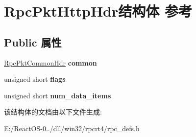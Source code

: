 \hypertarget{struct_rpc_pkt_http_hdr}{}\section{Rpc\+Pkt\+Http\+Hdr结构体 参考}
\label{struct_rpc_pkt_http_hdr}
\subsection*{Public 属性}
\begin{DoxyCompactItemize}
\item 
\mbox{\label{struct_rpc_pkt_http_hdr_acc02497468437b825fa3b664916b30fb}} 
\hyperlink{struct_rpc_pkt_common_hdr}{Rpc\+Pkt\+Common\+Hdr} {\bfseries common}
\item 
\mbox{\label{struct_rpc_pkt_http_hdr_adf2f73e5efa2e0e5c2063bb1c9366606}} 
unsigned short {\bfseries flags}
\item 
\mbox{\label{struct_rpc_pkt_http_hdr_a43756be3dbf115655798784a4467571a}} 
unsigned short {\bfseries num\+\_\+data\+\_\+items}
\end{DoxyCompactItemize}


该结构体的文档由以下文件生成\+:\begin{DoxyCompactItemize}
\item 
E\+:/\+React\+O\+S-\/0../dll/win32/rpcrt4/rpc\+\_\+defs.\+h\end{DoxyCompactItemize}
